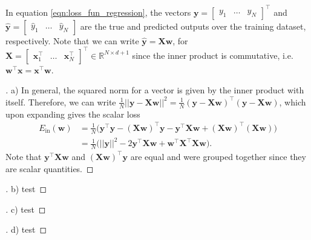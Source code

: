 \documentclass{article}
\newcommand{\R}{\mathbb{R}}
\newcommand{\mat}[1]{\begin{bmatrix}#1\end{bmatrix}}
\renewcommand{\vec}[1]{\mathbf{#1}}
\begin{document}
    In equation \ref{eqn:loss_fun_regression}, the vectors $\vec{y} = 
    \mat{y_1 & \ldots & y_N}^\intercal$ and $\hat{\vec{y}} = \mat{\hat{y}_1 & 
    \ldots & \hat{y}_N}$ are the true and predicted outputs over the training 
    dataset, respectively. Note that we can write $\hat{\vec{y}} = \vec{X}
    \vec{w}$, for $\vec{X}=\mat{\vec{x}_1^\intercal & \ldots & \vec{x}_N^
    \intercal} ^\intercal \in \R^{N \times d+1}$ since the inner product is 
    commutative, i.e. $\vec{w}^\intercal \vec{x} = \vec{x}^\intercal \vec{w}$.

    \begin{proof}[\unskip\nopunct]
        a) In general, the squared norm for a vector is given by the inner 
        product with itself. Therefore, we can write
        $\frac{1}{N}||\vec{y}-\vec{X}\vec{w}||^2 = \frac{1}{N}(\vec{y}-\vec{X}
        \vec{w})^\intercal(\vec{y} - \vec{X}\vec{w})$, which upon expanding 
        gives the scalar loss 
        \begin{align*}
            E_{\text{in}}(\vec{w}) &= 
            \frac{1}{N}\Big(\vec{y}^\intercal\vec{y}-(\vec{X}
            \vec{w})^\intercal\vec{y} - \vec{y}^\intercal \vec{X}\vec{w}
            + (\vec{X}\vec{w})^\intercal (\vec{X}\vec{w}) \Big)\\
            &= \frac{1}{N}\big(||\vec{y}||^2 - 2\vec{y}^\intercal 
            \vec{X}\vec{w} + \vec{w}^\intercal \vec{X}^\intercal
            \vec{X}\vec{w}\big).
        \end{align*}
        Note that $\vec{y}^\intercal\vec{X}\vec{w}$ and $(\vec{X}\vec{w})
        ^\intercal\vec{y}$ are equal and were grouped together since 
        they are scalar quantities.
    \end{proof}

    \begin{proof}[\unskip\nopunct]
        b) test
    \end{proof}

    \begin{proof}[\unskip\nopunct]
        c) test
    \end{proof}

    \begin{proof}[\unskip\nopunct]
        d) test
    \end{proof}
\end{document}
